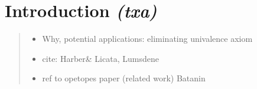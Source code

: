 \section{Introduction \textit{(txa)}}
\begin{quote}
  \begin{itemize}
  \item 
    Why, potential applications: eliminating univalence axiom
  \item cite: Harber\& Licata, Lumsdene
  \item ref to opetopes paper (related work) Batanin
  \end{itemize}
\end{quote}
